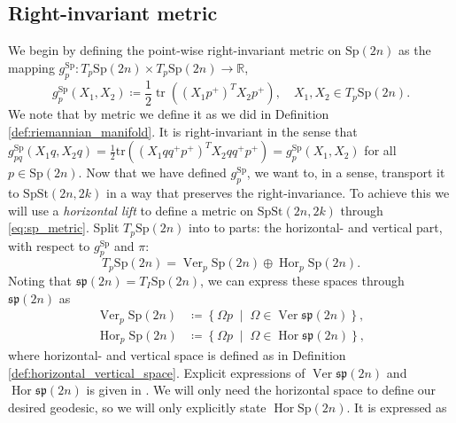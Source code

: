 \subsection{Right-invariant metric}
We begin by defining the point-wise right-invariant metric on $\mathrm{Sp}(2n)$ as the mapping $g_{p}^{\mathrm{Sp}}\colon T_{p}\mathrm{Sp}(2n)\times T_{p}\mathrm{Sp}(2n)\xrightarrow{}\mathbb{R}$, 
\begin{equation}\label{eq:sp_metric}
    g_{p}^{\mathrm{Sp}}(X_{1},X_{2})\coloneqq\frac{1}{2}\operatorname{tr}((X_{1}p^{+})^{T}X_{2}p^{+}),\quad X_{1},X_{2}\in T_{p}\mathrm{Sp}(2n).
\end{equation}
We note that by metric we define it as we did in Definition \ref{def:riemannian_manifold}. It is right-invariant in the sense that
$g_{pq}^{\mathrm{Sp}}(X_{1}q,X_{2}q)=\tfrac{1}{2}\mathrm{tr}((X_{1}qq^{+}p^{+})^{T}X_{2}qq^{+}p^{+})=g_{p}^{\mathrm{Sp}}(X_{1},X_{2})$ for all $p\in \mathrm{Sp}(2n)$.
Now that we have defined $g_{p}^{\mathrm{Sp}}$, we want to, in a sense, transport it to $\mathrm{SpSt}(2n, 2k)$ in a way that preserves the right-invariance. To achieve this we will use a \textit{horizontal lift} to define a metric on $\mathrm{SpSt}(2n, 2k)$ through \ref{eq:sp_metric}. Split $T_{p}\mathrm{Sp}(2n)$ into to parts: the horizontal- and vertical part, with respect to $g^\mathrm{Sp}_{p}$ and $\pi$: %
\begin{equation}\label{eq:spst_split}
    T_{p}\mathrm{Sp}(2n)=\operatorname{Ver}_{p}\mathrm{Sp}(2n)\oplus \operatorname{Hor}_{p}\mathrm{Sp}(2n).
\end{equation}
%
%
%
Noting that $\mathfrak{sp}(2n)=T_{I}\mathrm{Sp}(2n)$, we can express these spaces through $\mathfrak{sp}(2n)$ as
%
\begin{align*}
\operatorname{Ver}_{p}\mathrm{Sp}(2n)&\coloneqq\left\{ \Omega p\;\middle|\;\Omega \in \operatorname{Ver}\mathfrak{sp}(2n) \right\}, \\
\operatorname{Hor}_{p}\mathrm{Sp}(2n)&\coloneqq\left\{ \Omega p\;\middle|\;\Omega \in \operatorname{Hor}\mathfrak{sp}(2n) \right\},
\end{align*}
%
where horizontal- and vertical space is defined as in Definition \ref{def:horizontal_vertical_space}. Explicit expressions of $\operatorname{Ver}\mathfrak{sp}(2n)$ and $\operatorname{Hor}\mathfrak{sp}(2n)$ is given in \cite[p.~11]{BendokatZimmermann2021}. We will only need the horizontal space to define our desired geodesic, so we will only explicitly state $\operatorname{Hor}\mathrm{Sp}(2n)$. It is expressed as

